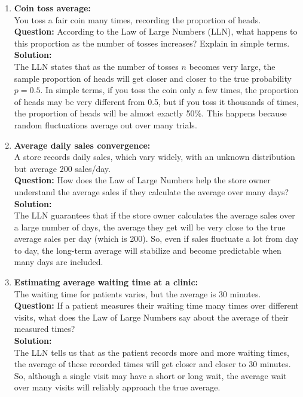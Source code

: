 \documentclass{book}
\begin{document}
\begin{enumerate}[label=Exercise \arabic*:]
    \item \textbf{Coin toss average:} \\
    You toss a fair coin many times, recording the proportion of heads. \\
    \textbf{Question:} According to the Law of Large Numbers (LLN), what happens to this proportion as the number of tosses increases? Explain in simple terms. \\
    \textbf{Solution:} \\
    The LLN states that as the number of tosses \(n\) becomes very large, the sample proportion of heads will get closer and closer to the true probability \(p = 0.5\). In simple terms, if you toss the coin only a few times, the proportion of heads may be very different from 0.5, but if you toss it thousands of times, the proportion of heads will be almost exactly 50\%. This happens because random fluctuations average out over many trials.

    \item \textbf{Average daily sales convergence:} \\
    A store records daily sales, which vary widely, with an unknown distribution but average 200 sales/day. \\
    \textbf{Question:} How does the Law of Large Numbers help the store owner understand the average sales if they calculate the average over many days? \\
    \textbf{Solution:} \\
    The LLN guarantees that if the store owner calculates the average sales over a large number of days, the average they get will be very close to the true average sales per day (which is 200). So, even if sales fluctuate a lot from day to day, the long-term average will stabilize and become predictable when many days are included.

    \item \textbf{Estimating average waiting time at a clinic:} \\
    The waiting time for patients varies, but the average is 30 minutes. \\
    \textbf{Question:} If a patient measures their waiting time many times over different visits, what does the Law of Large Numbers say about the average of their measured times? \\
    \textbf{Solution:} \\
    The LLN tells us that as the patient records more and more waiting times, the average of these recorded times will get closer and closer to 30 minutes. So, although a single visit may have a short or long wait, the average wait over many visits will reliably approach the true average.

\end{enumerate}
\end{document}
